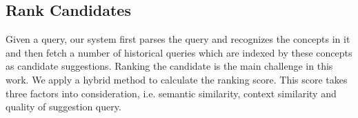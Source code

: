 \subsection{Rank Candidates}\label{sec:rank}
Given a query, our system first parses the query and recognizes the concepts
in it and then fetch a number of historical queries which are indexed by
these concepts as candidate suggestions.
%
%
Ranking the candidate is the main challenge in this work.
We apply a hybrid method to calculate the ranking score.
This score takes three factors into consideration,
i.e. semantic similarity, context similarity and quality of suggestion query.

